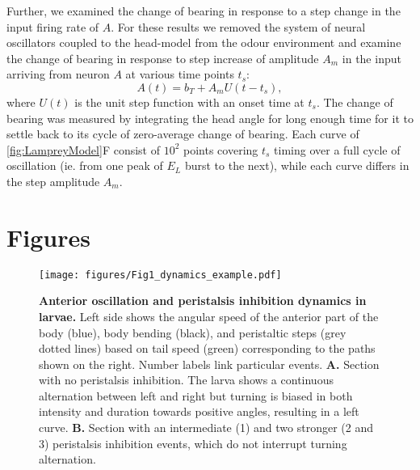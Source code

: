 \documentclass[11pt,a4paper]{article}
\begin{document}
Further, we examined the change of bearing in response to a step change in the input firing rate of $A$.
 For these results we removed the system of neural oscillators coupled to the head-model from the odour environment and examine the change of bearing in response to step increase of amplitude $A_m$ in the input arriving from neuron $A$ at various time points $t_s$:
\begin{equation}
A(t) = b_T + A_m U(t-t_s),
\end{equation}
where $U(t)$ is the unit step function with an onset time at $t_s$. The change of bearing was measured by integrating the head angle for long enough time for it to settle back to its cycle of zero-average change of bearing. Each curve of \ref{fig:LampreyModel}F consist of $10^2$ points covering $t_s$ timing over a full cycle of oscillation (ie. from one peak of $E_L$ burst to the next), while each curve differs in the step amplitude $A_m$.

\newpage
\section{Figures}


\begin{figure}
\begin{center}
\texttt{[image: figures/Fig1\_dynamics\_example.pdf]}
\caption{{\bf Anterior oscillation and peristalsis inhibition dynamics in larvae.} 
Left side shows the angular speed of the anterior part of the body (blue), body bending (black), and peristaltic steps (grey dotted lines) based on tail speed (green) corresponding to the paths shown on the right. Number labels link particular events. 
{\bf A.} Section with no peristalsis inhibition. The larva shows a continuous alternation between left and right but turning is biased in both intensity and duration towards positive angles, resulting in a left curve.
{\bf B.} Section with an intermediate (1) and two stronger (2 and 3) peristalsis inhibition events, which do not interrupt turning alternation.
\label{fig:DynamicsExample}
}
\end{center}
\end{figure}
\end{document}
